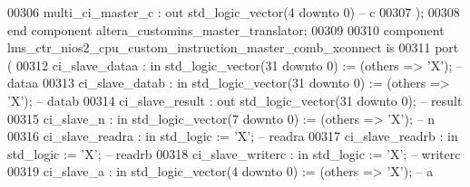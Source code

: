 \begin{DoxyCode}
00306             multi\_ci\_master\_c         : \textcolor{keywordflow}{out} \textcolor{comment}{std\_logic\_vector}(\textcolor{vhdllogic}{}\textcolor{vhdllogic}{4} \textcolor{keywordflow}{downto} \textcolor{vhdllogic}{}\textcolor{vhdllogic}{0})\textcolor{keyword}{                      -- c}
00307         );
00308     \textcolor{keywordflow}{end} \textcolor{keywordflow}{component} \textcolor{vhdlchar}{altera_customins_master_translator};
00309 
00310     \textcolor{keywordflow}{component} lms\_ctr\_nios2\_cpu\_custom\_instruction\_master\_comb\_xconnect \textcolor{keywordflow}{is}
00311         \textcolor{keywordflow}{port} (
00312             ci\_slave\_dataa      : \textcolor{keywordflow}{in}  \textcolor{comment}{std\_logic\_vector}(\textcolor{vhdllogic}{}\textcolor{vhdllogic}{31} \textcolor{keywordflow}{downto} \textcolor{vhdllogic}{}\textcolor{vhdllogic}{0}) := (\textcolor{keywordflow}{others} => 'X'); \textcolor{keyword}{-- dataa}
00313             ci\_slave\_datab      : \textcolor{keywordflow}{in}  \textcolor{comment}{std\_logic\_vector}(\textcolor{vhdllogic}{}\textcolor{vhdllogic}{31} \textcolor{keywordflow}{downto} \textcolor{vhdllogic}{}\textcolor{vhdllogic}{0}) := (\textcolor{keywordflow}{others} => 'X'); \textcolor{keyword}{-- datab}
00314             ci\_slave\_result     : \textcolor{keywordflow}{out} \textcolor{comment}{std\_logic\_vector}(\textcolor{vhdllogic}{}\textcolor{vhdllogic}{31} \textcolor{keywordflow}{downto} \textcolor{vhdllogic}{}\textcolor{vhdllogic}{0});                    \textcolor{keyword}{-- result}
00315             ci\_slave\_n          : \textcolor{keywordflow}{in}  \textcolor{comment}{std\_logic\_vector}(\textcolor{vhdllogic}{}\textcolor{vhdllogic}{7} \textcolor{keywordflow}{downto} \textcolor{vhdllogic}{}\textcolor{vhdllogic}{0})  := (\textcolor{keywordflow}{others} => 'X'); \textcolor{keyword}{-- n}
00316             ci\_slave\_readra     : \textcolor{keywordflow}{in}  \textcolor{comment}{std\_logic}                     := 'X';             \textcolor{keyword}{-- readra}
00317             ci\_slave\_readrb     : \textcolor{keywordflow}{in}  \textcolor{comment}{std\_logic}                     := 'X';             \textcolor{keyword}{-- readrb}
00318             ci\_slave\_writerc    : \textcolor{keywordflow}{in}  \textcolor{comment}{std\_logic}                     := 'X';             \textcolor{keyword}{-- writerc}
00319             ci\_slave\_a          : \textcolor{keywordflow}{in}  \textcolor{comment}{std\_logic\_vector}(\textcolor{vhdllogic}{}\textcolor{vhdllogic}{4} \textcolor{keywordflow}{downto} \textcolor{vhdllogic}{}\textcolor{vhdllogic}{0})  := (\textcolor{keywordflow}{others} => 'X'); \textcolor{keyword}{-- a}

\end{DoxyCode}
